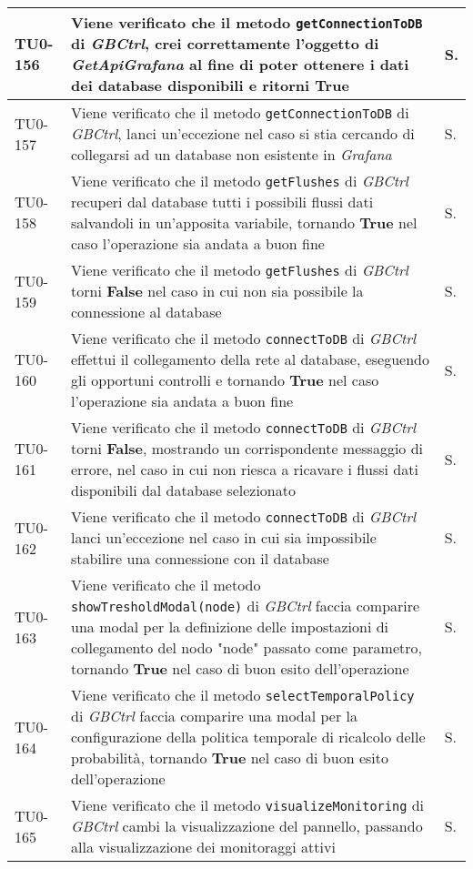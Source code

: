 \begin{longtable}{|C{.15\textwidth}|m{.66\textwidth}|C{.10\textwidth}|}
\hline
TU0-156 & Viene verificato che il metodo \texttt{getConnectionToDB} di \textit{GBCtrl}, crei correttamente l'oggetto di \textit{GetApiGrafana} al fine di poter ottenere i dati dei database disponibili e ritorni \textbf{True} & S.\\
\hline
{}TU0-157 & Viene verificato che il metodo \texttt{getConnectionToDB} di \textit{GBCtrl}, lanci un'eccezione nel caso si stia cercando di collegarsi ad un database non esistente in \textit{Grafana} & S.\\
\hline
TU0-158 & Viene verificato che il metodo \texttt{getFlushes} di \textit{GBCtrl} recuperi dal database tutti i possibili flussi dati salvandoli in un'apposita variabile, tornando \textbf{True} nel caso l'operazione sia andata a buon fine & S.\\
\hline
{}TU0-159 & Viene verificato che il metodo \texttt{getFlushes} di \textit{GBCtrl} torni \textbf{False} nel caso in cui non sia possibile la connessione al database & S.\\
\hline
TU0-160 & Viene verificato che il metodo \texttt{connectToDB} di \textit{GBCtrl} effettui il collegamento della rete al database, eseguendo gli opportuni controlli e tornando \textbf{True} nel caso l'operazione sia andata a buon fine & S.\\
\hline
{}TU0-161 & Viene verificato che il metodo \texttt{connectToDB} di \textit{GBCtrl} torni \textbf{False}, mostrando un corrispondente messaggio di errore, nel caso in cui non riesca a ricavare i flussi dati disponibili dal database selezionato & S.\\
\hline
TU0-162 & Viene verificato che il metodo \texttt{connectToDB} di \textit{GBCtrl} lanci un'eccezione nel caso in cui sia impossibile stabilire una connessione con il database & S.\\
\hline
{}TU0-163 & Viene verificato che il metodo \texttt{showTresholdModal(node)} di \textit{GBCtrl} faccia comparire una modal per la definizione delle impostazioni di collegamento del nodo "node" passato come parametro, tornando \textbf{True} nel caso di buon esito dell'operazione & S.\\
\hline
TU0-164 & Viene verificato che il metodo \texttt{selectTemporalPolicy} di \textit{GBCtrl} faccia comparire una modal per la configurazione della politica temporale di ricalcolo delle probabilità, tornando \textbf{True} nel caso di buon esito dell'operazione & S.\\
\hline
{}TU0-165 & Viene verificato che il metodo \texttt{visualizeMonitoring} di \textit{GBCtrl} cambi la visualizzazione del pannello, passando alla visualizzazione dei monitoraggi attivi & S.\\

\end{longtable}
